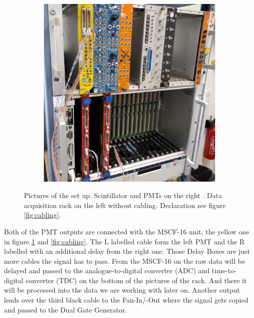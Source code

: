 \documentclass[]{article}
\begin{document}
\begin{figure}[H]
\begin{subfigure}[h]{0.59\textwidth}
\includegraphics[width=1\textwidth]{Plots/Raw.jpg}
\end{subfigure}
\caption{Pictures of the set up. Scintillator and PMTs on the right \cite{script}. Data acquisition rack on the left without cabling. Declaration see figure \ref{fig:cabling}.}
\label{fig:setup}
\end{figure}

Both of the PMT outputs are connected with the MSCF-16 unit, the yellow one in figure \ref{fig:setup} and \ref{fig:cabling}. The L labelled cable form the left PMT and the R labelled with an additional delay from the right one. Those Delay Boxes are just more cables the signal has to pass. From the MSCF-16 on the raw data will be delayed and passed to the analogue-to-digital converter (ADC) and time-to-digital converter (TDC) on the bottom of the pictures of the rack. And there it will be processed into the data we are working with later on. Another output leads over the third black cable to the Fan-In/-Out where the signal gets copied and passed to the Dual Gate Generator.

\end{document}
